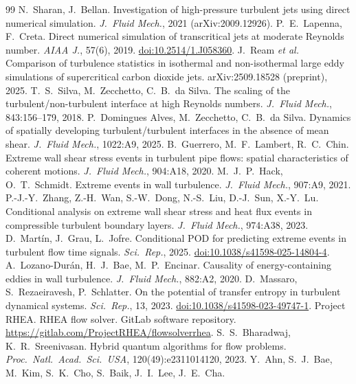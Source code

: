 \documentclass[11pt]{article}
\begin{document}
\begin{thebibliography}{99}
 N.\ Sharan, J.\ Bellan. Investigation of high-pressure turbulent jets using direct numerical simulation. \emph{J.\ Fluid Mech.}, 2021 (arXiv:2009.12926).
 P.\ E.\ Lapenna, F.\ Creta. Direct numerical simulation of transcritical jets at moderate Reynolds number. \emph{AIAA J.}, 57(6), 2019. \href{https://doi.org/10.2514/1.J058360}{doi:10.2514/1.J058360}.
 J.\ Ream \emph{et al.} Comparison of turbulence statistics in isothermal and non-isothermal large eddy simulations of supercritical carbon dioxide jets. arXiv:2509.18528 (preprint), 2025.
 T.\ S.\ Silva, M.\ Zecchetto, C.\ B.\ da Silva. The scaling of the turbulent/non-turbulent interface at high Reynolds numbers. \emph{J.\ Fluid Mech.}, 843:156--179, 2018.
 P.\ Domingues Alves, M.\ Zecchetto, C.\ B.\ da Silva. Dynamics of spatially developing turbulent/turbulent interfaces in the absence of mean shear. \emph{J.\ Fluid Mech.}, 1022:A9, 2025.
 B.\ Guerrero, M.\ F.\ Lambert, R.\ C.\ Chin. Extreme wall shear stress events in turbulent pipe flows: spatial characteristics of coherent motions. \emph{J.\ Fluid Mech.}, 904:A18, 2020.
 M.\ J.\ P.\ Hack, O.\ T.\ Schmidt. Extreme events in wall turbulence. \emph{J.\ Fluid Mech.}, 907:A9, 2021.
 P.-J.-Y.\ Zhang, Z.-H.\ Wan, S.-W.\ Dong, N.-S.\ Liu, D.-J.\ Sun, X.-Y.\ Lu. Conditional analysis on extreme wall shear stress and heat flux events in compressible turbulent boundary layers. \emph{J.\ Fluid Mech.}, 974:A38, 2023.
 D.\ Mart\'in, J.\ Grau, L.\ Jofre. Conditional POD for predicting extreme events in turbulent flow time signals. \emph{Sci.\ Rep.}, 2025. \href{https://doi.org/10.1038/s41598-025-14804-4}{doi:10.1038/s41598-025-14804-4}.
 A.\ Lozano-Dur\'an, H.\ J.\ Bae, M.\ P.\ Encinar. Causality of energy-containing eddies in wall turbulence. \emph{J.\ Fluid Mech.}, 882:A2, 2020.
 D.\ Massaro, S.\ Rezaeiravesh, P.\ Schlatter. On the potential of transfer entropy in turbulent dynamical systems. \emph{Sci.\ Rep.}, 13, 2023. \href{https://doi.org/10.1038/s41598-023-49747-1}{doi:10.1038/s41598-023-49747-1}.
 Project RHEA. RHEA flow solver. GitLab software repository. \url{https://gitlab.com/ProjectRHEA/flowsolverrhea}.
 S.\ S.\ Bharadwaj, K.\ R.\ Sreenivasan. Hybrid quantum algorithms for flow problems. \emph{Proc.\ Natl.\ Acad.\ Sci.\ USA}, 120(49):e2311014120, 2023.
 Y.\ Ahn, S.\ J.\ Bae, M.\ Kim, S.\ K.\ Cho, S.\ Baik, J.\ I.\ Lee, J.\ E.\ Cha.

\end{thebibliography}
\end{document}
